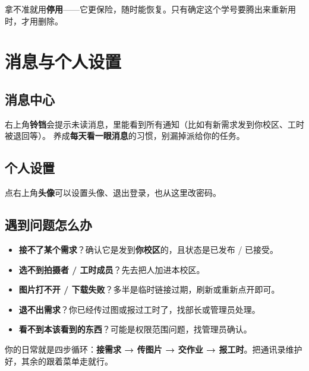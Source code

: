 \documentclass[cn,11pt,green]{elegantbook}
\begin{document}
\begin{tipbox}[停用还是删除？]
  拿不准就用\textbf{停用}——它更保险，随时能恢复。只有确定这个学号要腾出来重新用时，才用删除。
\end{tipbox}

\chapter{消息与个人设置}

\section{消息中心}

右上角\textbf{铃铛}会提示未读消息，里能看到所有通知（比如有新需求发到你校区、工时被退回等）。
养成\textbf{每天看一眼消息}的习惯，别漏掉派给你的任务。

\section{个人设置}

点右上角\textbf{头像}可以设置头像、退出登录，也从这里改密码。

\section{遇到问题怎么办}

\begin{tipbox}[常见小问题]
  \begin{itemize}
    \item \textbf{接不了某个需求}？确认它是发到\textbf{你校区}的，且状态是已发布 / 已接受。
    \item \textbf{选不到拍摄者 / 工时成员}？先去把人加进本校区。
    \item \textbf{图片打不开 / 下载失败}？多半是临时链接过期，刷新或重新点开即可。
    \item \textbf{退不出需求}？你已经传过图或报过工时了，找部长或管理员处理。
    \item \textbf{看不到本该看到的东西}？可能是权限范围问题，找管理员确认。
  \end{itemize}
\end{tipbox}

\begin{notebox}[记住一句话]
  你的日常就是四步循环：\textbf{接需求 → 传图片 → 交作业 → 报工时}。把通讯录维护好，其余的跟着菜单走就行。
\end{notebox}
\end{document}
